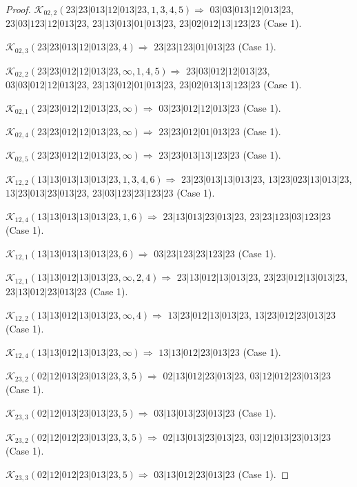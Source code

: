 \documentclass[12pt]{article}
\theoremstyle{plain}
\theoremstyle{definition}
\theoremstyle{remark}
\newcommand{\fancy}[1]{\mathcal{#1}}
\def\K{\fancy{K}}
\begin{document}
\begin{proof}
	$\K_{02,2}(23|23|013|12|013|23,1, 3, 4, 5)\Rightarrow $ $03|03|013|12|013|23$, $23|03|123|12|013|23$, $23|13|013|01|013|23$, $23|02|012|13|123|23$ (Case 1).
	
	$\K_{02,3}(23|23|013|12|013|23,4)\Rightarrow $ $23|23|123|01|013|23$ (Case 1).
	
	
	\bigskip
	
	$\K_{02,2}(23|23|012|12|013|23,\infty,1, 4, 5)\Rightarrow $ $23|03|012|12|013|23$, $03|03|012|12|013|23$, $23|13|012|01|013|23$, $23|02|013|13|123|23$ (Case 1).
	
	$\K_{02,1}(23|23|012|12|013|23,\infty)\Rightarrow $ $03|23|012|12|013|23$ (Case 1).
	
	$\K_{02,4}(23|23|012|12|013|23,\infty)\Rightarrow $ $23|23|012|01|013|23$ (Case 1).
	
	$\K_{02,5}(23|23|012|12|013|23,\infty)\Rightarrow $ $23|23|013|13|123|23$ (Case 1).
	
	
	\bigskip
	
	$\K_{12,2}(13|13|013|13|013|23,1, 3, 4, 6)\Rightarrow $ $23|23|013|13|013|23$, $13|23|023|13|013|23$, $13|23|013|23|013|23$, $23|03|123|23|123|23$ (Case 1).
	
	$\K_{12,4}(13|13|013|13|013|23,1, 6)\Rightarrow $ $23|13|013|23|013|23$, $23|23|123|03|123|23$ (Case 1).
	
	$\K_{12,1}(13|13|013|13|013|23,6)\Rightarrow $ $03|23|123|23|123|23$ (Case 1).
	
	
	\bigskip
	
	$\K_{12,1}(13|13|012|13|013|23,\infty,2, 4)\Rightarrow $ $23|13|012|13|013|23$, $23|23|012|13|013|23$, $23|13|012|23|013|23$ (Case 1).
	
	$\K_{12,2}(13|13|012|13|013|23,\infty,4)\Rightarrow $ $13|23|012|13|013|23$, $13|23|012|23|013|23$ (Case 1).
	
	$\K_{12,4}(13|13|012|13|013|23,\infty)\Rightarrow $ $13|13|012|23|013|23$ (Case 1).
	
	
	\bigskip
	
	$\K_{23,2}(02|12|013|23|013|23,3, 5)\Rightarrow $ $02|13|012|23|013|23$, $03|12|012|23|013|23$ (Case 1).
	
	$\K_{23,3}(02|12|013|23|013|23,5)\Rightarrow $ $03|13|013|23|013|23$ (Case 1).
	
	
	\bigskip
	
	$\K_{23,2}(02|12|012|23|013|23,3, 5)\Rightarrow $ $02|13|013|23|013|23$, $03|12|013|23|013|23$ (Case 1).
	
	$\K_{23,3}(02|12|012|23|013|23,5)\Rightarrow $ $03|13|012|23|013|23$ (Case 1).
	

\end{proof}
\end{document}
